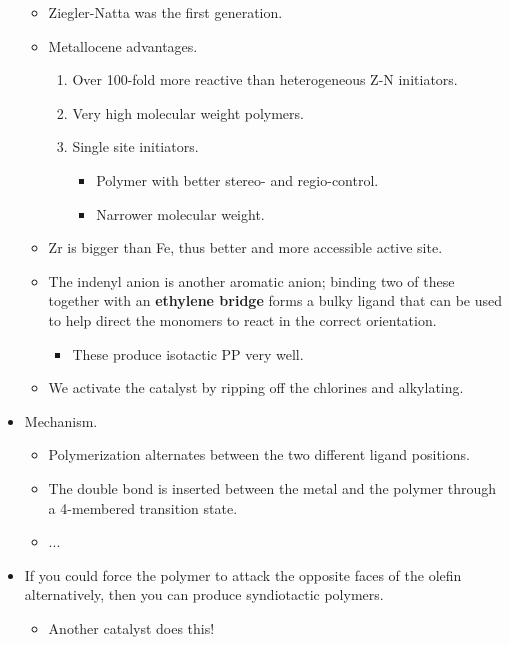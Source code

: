 \documentclass[../notes.tex]{subfiles}
\begin{document}
\begin{itemize}
    \begin{itemize}
        \item Ziegler-Natta was the first generation.
        \item Metallocene advantages.
        \begin{enumerate}
            \item Over 100-fold more reactive than heterogeneous Z-N initiators.
            \item Very high molecular weight polymers.
            \item Single site initiators.
            \begin{itemize}
                \item Polymer with better stereo- and regio-control.
                \item Narrower molecular weight.
            \end{itemize}
        \end{enumerate}
        \item Zr is bigger than Fe, thus better and more accessible active site.
        \item The indenyl anion is another aromatic anion; binding two of these together with an \textbf{ethylene bridge} forms a bulky ligand that can be used to help direct the monomers to react in the correct orientation.
        \begin{itemize}
            \item These produce isotactic PP very well.
        \end{itemize}
        \item We activate the catalyst by ripping off the chlorines and alkylating.
    \end{itemize}
    \item Mechanism.
    \begin{itemize}
        \item Polymerization alternates between the two different ligand positions.
        \item The double bond is inserted between the metal and the polymer through a 4-membered transition state.
        \item ...
    \end{itemize}
    \item If you could force the polymer to attack the opposite faces of the olefin alternatively, then you can produce syndiotactic polymers.
    \begin{itemize}
        \item Another catalyst does this!

\end{itemize}
\end{itemize}
\end{document}

